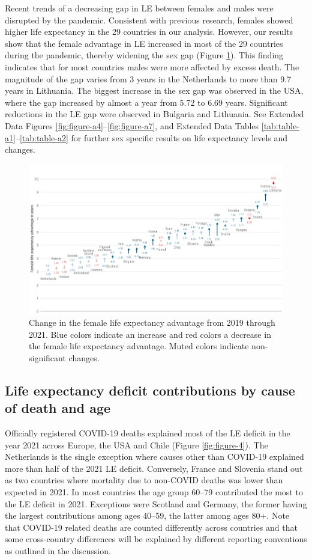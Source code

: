 \documentclass[12pt]{article}
\begin{document}
Recent trends of a decreasing gap in LE between females and males\citealp{Zarulli2021} were disrupted by the pandemic. Consistent with previous research, females showed higher life expectancy in the 29 countries in our analysis. However, our results show that the female advantage in LE increased in most of the 29 countries during the pandemic, thereby widening the sex gap (Figure \ref{fig:figure-3}). This finding indicates that for most countries males were more affected by excess death. The magnitude of the gap varies from 3 years in the Netherlands to more than 9.7 years in Lithuania. The biggest increase in the sex gap was observed in the USA, where the gap increased by almost a year from 5.72 to 6.69 years. Significant reductions in the LE gap were observed in Bulgaria and Lithuania. See Extended Data Figures \ref{fig:figure-a4}--\ref{fig:figure-a7}, and Extended Data Tables \ref{tab:table-a1}--\ref{tab:table-a2} for further sex specific results on life expectancy levels and changes.

\begin{figure}[ht!]
    \centering
    \includegraphics{figure-3.pdf}
    \caption{Change in the female life expectancy advantage from 2019 through 2021. Blue colors indicate an increase and red colors a decrease in the female life expectancy advantage. Muted colors indicate non-significant changes.}
    \label{fig:figure-3}
\end{figure}

\subsection*{Life expectancy deficit contributions by cause of death and age}

Officially registered COVID-19 deaths explained most of the LE deficit in the year 2021 across Europe, the USA and Chile (Figure \ref{fig:figure-4}). The Netherlands is the single exception where causes other than COVID-19 explained more than half of the 2021 LE deficit. Conversely, France and Slovenia stand out as two countries where mortality due to non-COVID deaths was lower than expected in 2021. In most countries the age group 60--79 contributed the most to the LE deficit in 2021. Exceptions were Scotland and Germany, the former having the largest contributions among ages 40--59, the latter among ages 80+. Note that COVID-19 related deaths are counted differently across countries and that some cross-country differences will be explained by different reporting conventions as outlined in the discussion.
\end{document}
